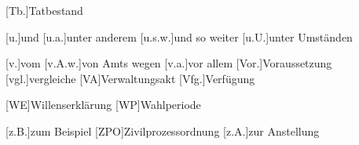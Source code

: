 \begin{acronym}[MittRhNotK]
[Tb.]{Tatbestand}

[u.]{und}
[u.a.]{unter anderem}
[u.s.w.]{und so weiter}
[u.U.]{unter Umständen}

[v.]{vom}
[v.A.w.]{von Amts wegen}
[v.a.]{vor allem}
[Vor.]{Voraussetzung}
[vgl.]{vergleiche}
[VA]{Verwaltungsakt}
[Vfg.]{Verfügung}

[WE]{Willenserklärung}
[WP]{Wahlperiode}

[z.B.]{zum Beispiel}
[ZPO]{Zivilprozessordnung}
[z.A.]{zur Anstellung}
\end{acronym}



